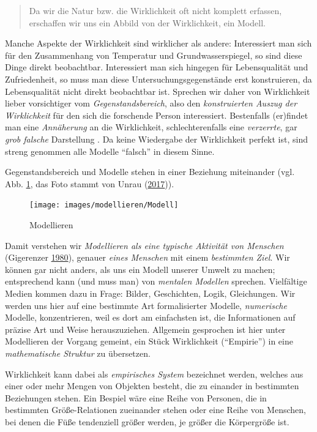 \documentclass[12pt,ngerman,]{book}
\theoremstyle{definition}
\theoremstyle{definition}
\theoremstyle{remark}
\begin{document}
\begin{quote}
Da wir die Natur bzw. die Wirklichkeit oft nicht komplett erfassen,
erschaffen wir uns ein Abbild von der Wirklichkeit, ein Modell.
\end{quote}

Manche Aspekte der Wirklichkeit sind wirklicher als andere: Interessiert
man sich für den Zusammenhang von Temperatur und Grundwasserspiegel, so
sind diese Dinge direkt beobachtbar. Interessiert man sich hingegen für
Lebensqualität und Zufriedenheit, so muss man diese
Untersuchungsgegenstände erst konstruieren, da Lebensqualität nicht
direkt beobachtbar ist. Sprechen wir daher von Wirklichkeit lieber
vorsichtiger vom \emph{Gegenstandsbereich}, also den \emph{konstruierten
Auszug der Wirklichkeit} für den sich die forschende Person
interessiert. Bestenfalls (er)findet man eine \emph{Annäherung} an die
Wirklichkeit, schlechterenfalls eine \emph{verzerrte}, gar \emph{grob
falsche} Darstellung . Da keine Wiedergabe der Wirklichkeit perfekt ist,
sind streng genommen alle Modelle ``falsch'' in diesem Sinne.

Gegenstandsbereich und Modelle stehen in einer Beziehung miteinander
(vgl. Abb. \ref{fig:modellieren-plot}, das Foto stammt von Unrau
(\protect\hyperlink{ref-unrau1}{2017})).

\begin{figure}

{\centering \texttt{[image: images/modellieren/Modell]} 

}

\caption{Modellieren}\label{fig:modellieren-plot}
\end{figure}

Damit verstehen wir \emph{Modellieren als eine typische Aktivität von
Menschen} (Gigerenzer \protect\hyperlink{ref-gigerenzer1980}{1980}),
genauer \emph{eines Menschen} mit einem \emph{bestimmten Ziel}. Wir
können gar nicht anders, als uns ein Modell unserer Umwelt zu machen;
entsprechend kann (und muss man) von \emph{mentalen Modellen} sprechen.
Vielfältige Medien kommen dazu in Frage: Bilder, Geschichten, Logik,
Gleichungen. Wir werden uns hier auf eine bestimmte Art formalisierter
Modelle, \emph{numerische} Modelle, konzentrieren, weil es dort am
einfachsten ist, die Informationen auf präzise Art und Weise
herauszuziehen. Allgemein gesprochen ist hier unter Modellieren der
Vorgang gemeint, ein Stück Wirklichkeit (``Empirie'') in eine
\emph{mathematische Struktur} zu übersetzen.

Wirklichkeit kann dabei als \emph{empirisches System} bezeichnet werden,
welches aus einer oder mehr Mengen von Objekten besteht, die zu einander
in bestimmten Beziehungen stehen. Ein Bespiel wäre eine Reihe von
Personen, die in bestimmten Größe-Relationen zueinander stehen oder eine
Reihe von Menschen, bei denen die Füße tendenziell größer werden, je
größer die Körpergröße ist.
\end{document}
